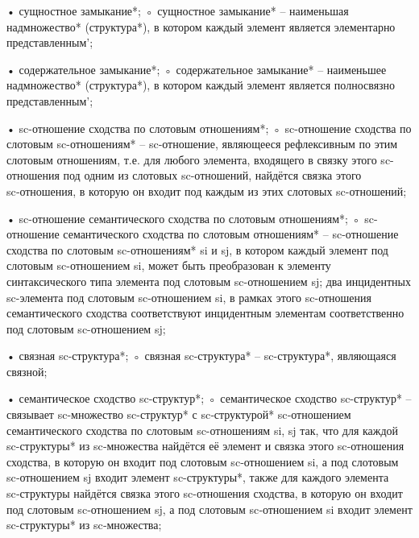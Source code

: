\begin{SCn}
\end{SCn}
• сущностное замыкание*;
◦ сущностное замыкание* – наименьшая надмножество* (структура*), в котором каждый элемент является элементарно представленным’;

\begin{SCn}
\end{SCn}
• содержательное замыкание*;
◦ содержательное замыкание* – наименьшее надмножество* (структура*), в котором каждый элемент является полносвязно представленным’;

\begin{SCn}
\end{SCn}
• sc-отношение сходства по слотовым отношениям*;
◦ sc-отношение сходства по слотовым sc-отношениям* – sc-отношение, являющееся рефлексивным по этим слотовым отношениям, т.е. для любого элемента, входящего в связку этого sc-отношения под одним из слотовых sc-отношений, найдётся связка этого sc‑отношения, в которую он входит под каждым из этих слотовых sc-отношений;

\begin{SCn}
\end{SCn}
• sc-отношение семантического сходства по слотовым отношениям*;
◦ sc-отношение семантического сходства по слотовым отношениям* – sc-отношение сходства по слотовым sc-отношениям* si и sj, в котором каждый элемент под слотовым sc-отношением si, может быть преобразован к элементу синтаксического типа элемента под слотовым sc-отношением sj; два инцидентных sc-элемента под слотовым sc-отношением si, в рамках этого sc-отношения семантического сходства соответствуют инцидентным элементам соответственно под слотовым sc-отношением sj;

\begin{SCn}
\end{SCn}
• связная sc-структура*;
◦ связная sc-структура* – sc-структура*, являющаяся связной;

\begin{SCn}
\end{SCn}
• семантическое сходство sc-структур*;
◦ семантическое сходство sc-структур* – связывает sc-множество sc-структур* с sc‑структурой* sc‑отношением семантического сходства по слотовым sc-отношениям si, sj так, что для каждой sc-структуры* из sc‑множества найдётся её элемент и связка этого sc‑отношения сходства, в которую он входит под слотовым sc‑отношением si, а под слотовым sc‑отношением sj входит элемент sc-структуры*, также для каждого элемента sc‑структуры найдётся связка этого sc-отношения сходства, в которую он входит под слотовым sc‑отношением sj, а под слотовым sc‑отношением si входит элемент sc-структуры* из sc‑множества;

